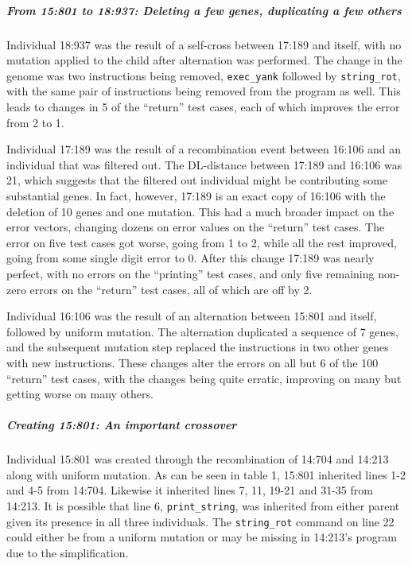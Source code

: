 
\subparagraph{From 15:801 to 18:937: Deleting a few genes, duplicating a few others}


Individual 18:937 was the result of a self-cross between 17:189 and itself,
with no mutation applied to the child after alternation was performed. The
change in the genome was two instructions being removed, 
\texttt{exec\_yank} followed by \texttt{string\_rot}, with the same pair of
instructions being removed from the program as well. This leads to changes
in 5 of the ``return'' test cases, each of which improves the error 
from 2 to 1.

Individual 17:189 was the result of a recombination event between 16:106
and an individual that was filtered out. The DL-distance between 17:189
and 16:106 was 21, which suggests that the filtered out individual might
be contributing some substantial genes. In fact, however, 17:189 is an
exact copy of 16:106 with the deletion of 10 genes and one mutation. This
had a much broader impact on the error vectors, changing dozens on error
values on the ``return'' test cases. The error on five test cases got worse,
going from 1 to 2, while all the rest improved, going from some single
digit error to 0. After this change 17:189 was nearly perfect, with no errors
on the ``printing'' test cases, and only five remaining non-zero errors on
the ``return'' test cases, all of which are off by 2.

Individual 16:106 was the result of an alternation between 15:801 and itself,
followed by uniform mutation. The alternation duplicated a sequence of 7 genes,
and the subsequent mutation step replaced the instructions in two other 
genes with new instructions. These changes alter the errors on all but 6 of
the 100 ``return'' test cases, with the changes being quite erratic, improving
on many but getting worse on many others.

\subparagraph{Creating 15:801: An important crossover}
\label{sec:15:801}
Individual 15:801 was created through the recombination of 14:704 and 14:213
along with uniform mutation. As can be seen in table 1, 15:801 inherited 
lines 1-2 and 4-5 from 14:704. Likewise it inherited lines 7, 11, 19-21 and 31-35
from 14:213. It is possible that line 6, \texttt{print\_string}, was inherited from either
parent given its presence in all three individuals. The \texttt{string\_rot} command on line
22 could either be from a uniform mutation or may be missing in 14:213's program due to the
simplification.

